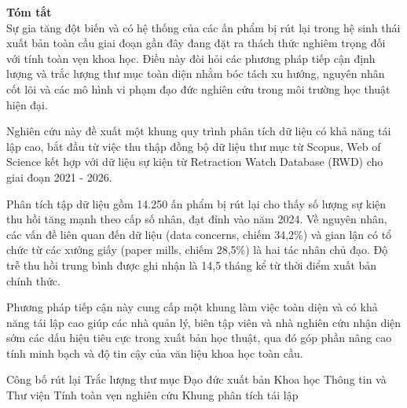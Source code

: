 \noindent\textbf{\sffamily\large Tóm tắt}\\[1pt]
 Sự gia tăng đột biến và có hệ thống của các ấn phẩm bị rút lại trong hệ sinh thái xuất bản toàn cầu giai đoạn gần đây đang đặt ra thách thức nghiêm trọng đối với tính toàn vẹn khoa học. Điều này đòi hỏi các phương pháp tiếp cận định lượng và trắc lượng thư mục toàn diện nhằm bóc tách xu hướng, nguyên nhân cốt lõi và các mô hình vi phạm đạo đức nghiên cứu trong môi trường học thuật hiện đại.\par\vspace{1pt}

 Nghiên cứu này đề xuất một khung quy trình phân tích dữ liệu có khả năng tái lập cao, bắt đầu từ việc thu thập đồng bộ dữ liệu thư mục từ Scopus, Web of Science kết hợp với dữ liệu sự kiện từ Retraction Watch Database (RWD) cho giai đoạn 2021 - 2026.\par\vspace{1pt}

 Phân tích tập dữ liệu gồm 14.250 ấn phẩm bị rút lại cho thấy số lượng sự kiện thu hồi tăng mạnh theo cấp số nhân, đạt đỉnh vào năm 2024. Về nguyên nhân, các vấn đề liên quan đến dữ liệu (data concerns, chiếm 34,2\%) và gian lận có tổ chức từ các xưởng giấy (paper mills, chiếm 28,5\%) là hai tác nhân chủ đạo. Độ trễ thu hồi trung bình được ghi nhận là 14,5 tháng kể từ thời điểm xuất bản chính thức.\par\vspace{1pt}

 Phương pháp tiếp cận này cung cấp một khung làm việc toàn diện và có khả năng tái lập cao giúp các nhà quản lý, biên tập viên và nhà nghiên cứu nhận diện sớm các dấu hiệu tiêu cực trong xuất bản học thuật, qua đó góp phần nâng cao tính minh bạch và độ tin cậy của văn liệu khoa học toàn cầu.\par\vspace{12pt}

Công bố rút lại \keywordseparator
Trắc lượng thư mục \keywordseparator
Đạo đức xuất bản \keywordseparator
Khoa học Thông tin và Thư viện \keywordseparator
Tính toàn vẹn nghiên cứu \keywordseparator
Khung phân tích tái lập